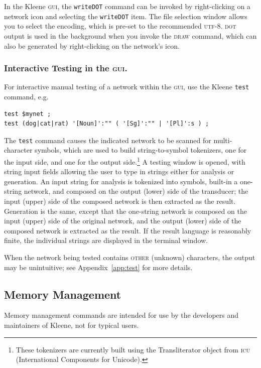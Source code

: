 \documentclass[letterpaper,12pt]{article}
\newcommand{\acro}{\textsc}
\begin{document}
In the Kleene \acro{gui}, the \verb!writeDOT! command can be invoked by
right-clicking on a network icon and selecting the \verb!writeDOT! item.
The file selection window allows you to select the encoding, which is
pre-set to the recommended \acro{utf-8}.  \acro{dot} output is used in the
background when you invoke the \acro{draw} command, which can also be
generated by right-clicking on the network's icon.

\subsubsection{Interactive Testing in the \acro{gui}.}

For interactive manual testing of a network within the \acro{gui},
use the Kleene \texttt{test} command, e.g.

\begin{Verbatim}[fontsize=\small]
test $mynet ;
test (dog|cat|rat) '[Noun]':"" ( '[Sg]':"" | '[Pl]':s ) ;
\end{Verbatim}

\noindent
The \texttt{test} command causes the indicated network to be scanned for
multi-character symbols, which are used to build 
string-to-symbol tokenizers, one for the input side, and one for
the output side.\footnote{These tokenizers are currently
built using the Transliterator object from \acro{icu} (International
Components for Unicode).}  A testing window is opened, with string
input fields allowing the user to type in strings either for
analysis or generation.  An input string for analysis is tokenized
into symbols, built-in a one-string network, and composed on the
output (lower) side of the transducer; the input (upper) side of
the composed network is then extracted as the result.  Generation
is the same, except that the one-string network is composed on the
input (upper) side of the original network, and the output (lower)
side of the composed network is extracted as the result.  If the
result language is reasonably finite, the individual strings are
displayed in the terminal window.

When the network being tested contains \acro{other} (unknown) characters,
the output may be unintuitive; see Appendix~\ref{app:test} for more
details.

\subsection{Memory Management}

Memory management commands are intended for use by the developers and
maintainers of Kleene, not for typical users.
\end{document}
